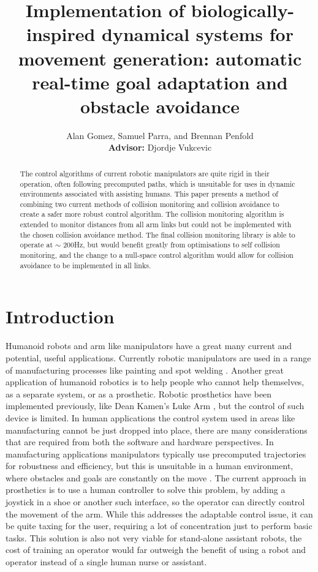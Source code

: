 \documentclass[a4paper, 10pt, conference]{ieeeconf}      %
\title{\LARGE \bf Implementation of biologically-inspired dynamical systems for movement generation: automatic real-time goal adaptation and obstacle avoidance}
\author{Alan Gomez, Samuel Parra, and Brennan Penfold \\ {\small \textbf{Advisor:} Djordje Vukcevic}}
\begin{document}
\maketitle
\thispagestyle{empty}
\pagestyle{empty}


\begin{abstract}
The control algorithms of current robotic manipulators are quite rigid in their operation, often following precomputed paths, which is unsuitable for uses in dynamic environments associated with assisting humans. This paper presents a method of combining two current methods of collision monitoring \cite{Khatib} and collision avoidance \cite{Hoffmann} to create a safer more robust control algorithm. The collision monitoring algorithm is extended to monitor distances from all arm links but could not be implemented with the chosen collision avoidance method. The final collision monitoring library is able to operate at $\sim$ 200Hz, but would benefit greatly from optimisations to self collision monitoring, and the change to a null-space control algorithm would allow for collision avoidance to be implemented in all links.


\end{abstract}


\section{Introduction} %

Humanoid robots and arm like manipulators have a great many current and potential, useful applications. Currently robotic manipulators are used in a range of manufacturing processes like painting and spot welding \cite{Fadalil}. Another great application of humanoid robotics is to help people who cannot help themselves, as a separate system, or as a prosthetic. Robotic prosthetics have been implemented previously, like Dean Kamen's Luke Arm \cite{Adee}, but the control of such device is limited. In human applications the control system used in areas like manufacturing cannot be just dropped into place, there are many considerations that are required from both the software and hardware perspectives. In manufacturing applications manipulators typically use precomputed trajectories for robustness and efficiency, but this is unsuitable in a human environment, where obstacles and goals are constantly on the move \cite{Hoffmann}. The current approach in prosthetics is to use a human controller to solve this problem, by adding a joystick in a shoe \cite{Adee} or another such interface, so the operator can directly control the movement of the arm. While this addresses the adaptable control issue, it can be quite taxing for the user, requiring a lot of concentration just to perform basic tasks. This solution is also not very viable for stand-alone assistant robots, the cost of training an operator would far outweigh the benefit of using a robot and operator instead of a single human nurse or assistant. \\
\end{document}
